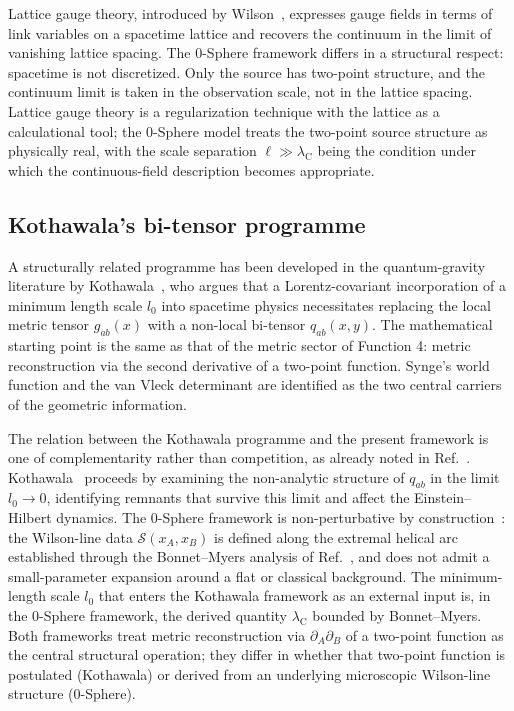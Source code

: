 \documentclass[%
 reprint, amsmath,amssymb, aps, prb, ]{revtex4-2}
\numberwithin{equation}{section}
\newcommand{\lambdaC}{\lambda_{\mathrm{C}}}
\begin{document}
Lattice gauge theory, introduced by Wilson~\cite{Wilson1974}, expresses gauge fields in terms of link variables on a spacetime lattice and recovers the continuum in the limit of vanishing lattice spacing. The 0-Sphere framework differs in a structural respect: spacetime is not discretized. Only the source has two-point structure, and the continuum limit is taken in the observation scale, not in the lattice spacing. Lattice gauge theory is a regularization technique with the lattice as a calculational tool; the 0-Sphere model treats the two-point source structure as physically real, with the scale separation $\ell \gg \lambdaC$ being the condition under which the continuous-field description becomes appropriate.

\subsection{Kothawala's bi-tensor programme}

A structurally related programme has been developed in the quantum-gravity literature by Kothawala~\cite{Kothawala2023}, who argues that a Lorentz-covariant incorporation of a minimum length scale $l_0$ into spacetime physics necessitates replacing the local metric tensor $g_{ab}(x)$ with a non-local bi-tensor $q_{ab}(x,y)$. The mathematical starting point is the same as that of the metric sector of Function 4: metric reconstruction via the second derivative of a two-point function. Synge's world function and the van Vleck determinant are identified as the two central carriers of the geometric information.

The relation between the Kothawala programme and the present framework is one of complementarity rather than competition, as already noted in Ref.~\cite{hanamura51}. Kothawala~\cite{Kothawala2023} proceeds by examining the non-analytic structure of $q_{ab}$ in the limit $l_0 \to 0$, identifying remnants that survive this limit and affect the Einstein--Hilbert dynamics. The 0-Sphere framework is non-perturbative by construction~\cite{hanamura36}: the Wilson-line data $\mathcal{S}(x_A, x_B)$ is defined along the extremal helical arc established through the Bonnet--Myers analysis of Ref.~\cite{hanamura51}, and does not admit a small-parameter expansion around a flat or classical background. The minimum-length scale $l_0$ that enters the Kothawala framework as an external input is, in the 0-Sphere framework, the derived quantity $\lambdaC$ bounded by Bonnet--Myers. Both frameworks treat metric reconstruction via $\partial_A\partial_B$ of a two-point function as the central structural operation; they differ in whether that two-point function is postulated (Kothawala) or derived from an underlying microscopic Wilson-line structure (0-Sphere).
\end{document}
